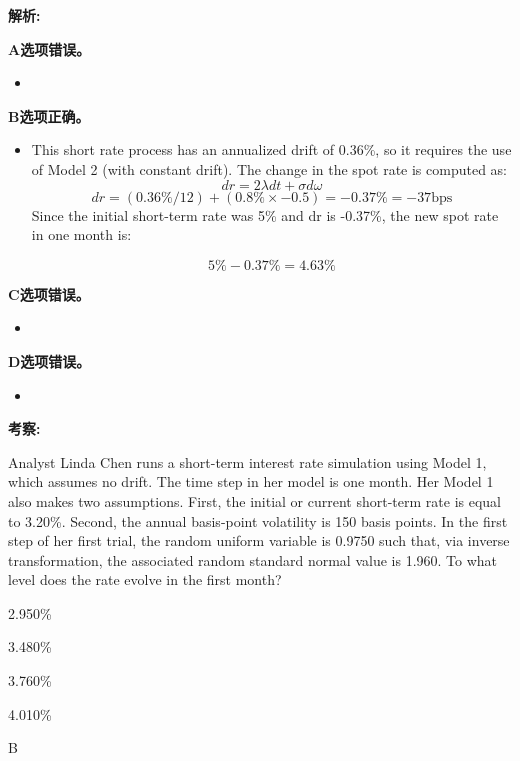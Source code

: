 \documentclass{article}
\newcounter{question} %
\newenvironment{explanation}
{\textbf{解析:}\par}
{\par}
\newcommand{\checklist}[1]{
    \textbf{考察:} #1 \par %
    \addcontentsline{toc}{subsection}{题号\thequestion 考察: #1} %
    \vspace{2em} %
}
\begin{document}
\begin{explanation}
    \textbf{A选项错误。}
    \begin{itemize}
        \item 
    \end{itemize}
    \textbf{B选项正确。}
    \begin{itemize}
        \item This short rate process has an annualized drift of 0.36\%, so it requires the use of
        Model 2 (with constant drift). The change in the spot rate is computed as:
\[
dr = 2\lambda dt + \sigma d\omega
\]
\[
dr = (0.36\% / 12) + (0.8\% \times -0.5) = -0.37\% = -37\text{bps}
\]
        Since the initial short-term rate was 5\% and dr is -0.37\%, the new spot rate in one month is:
        
\[
5\% - 0.37\% = 4.63\%
\]
    \end{itemize}
    \textbf{C选项错误。}
    \begin{itemize}
        \item 
    \end{itemize}
    \textbf{D选项错误。}
    \begin{itemize}
        \item 
    \end{itemize}
\end{explanation}
\checklist{}


\begin{question}
    Analyst Linda Chen runs a short-term interest rate simulation using Model 1, which assumes no drift. The time step in her model is one month. Her Model 1 also makes two assumptions. First, the initial or current short-term rate is equal to 3.20\%. Second, the annual basis-point volatility is 150 basis points. In the first step of her first trial, the random uniform variable is 0.9750 such that, via inverse transformation, the associated random standard normal value is 1.960. To what level does the rate evolve in the first month?
\end{question}

\begin{choices}
    \item 2.950\%
    \item 3.480\%
    \item 3.760\%
    \item 4.010\%
\end{choices}

\begin{correctanswer}
    B
\end{correctanswer}
\end{document}

